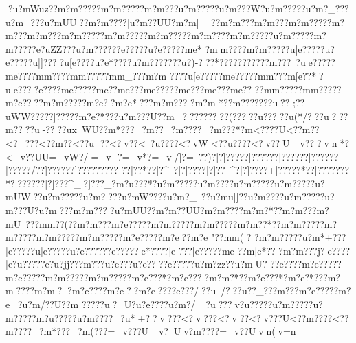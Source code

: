 {{{{{{{{{{{{{{{{{{{{{{{{{{{{{{{{{{{{{{{{{{{{{{{{{{{{{{{{{{{{{{{{{{{{{{{{{{{{{{{{{{{{{{{{{{{{{{{{{{{{{{{{{{{{{{{{{{{{{{{{{{{{{{{{{{{{{{{{{{{{{{{{{{{{{{{{{{{{{{{{{{{{{{{{{{{{{{{{{{{{{{{{{{{{{{{{{{{{{{{{{{{{{{{{{{{{{{{{{{{{{{{{{{{{{{{{{{{{{{{{{{{{{{{{{{{{{{{{{{{{{{{{{{{{{{{{{{{{{{{{{{{{{{{{{{{{{{{{{{{{{{{{{{{{{{{{{{{{{{{{{{{{{{{{{{{{{{{{{{{{{{{{{{{{{{{{{{{{{{{{{{{{{{{{{{{{{{{{{{{{{{{{{{{{{{{{{{{{{{{{{{{{{{{{{{{{{{{{{{{{{{{{{{{{{{{{{{{{{{{{{{{{{{{{{{{{{{{{{{{{{{{{{{{{{{{{{{{{{{{{{{{{{{{{{{{{{{{{{{{{{{{{{{{{{{{{{{{{{{{{{{{{{{{{{{{{{{{{{{{{{{{{{{{{{{{{{{{{{{{{{{{{{{{{{{{{{{{{{{{{{{{{{{{{{{{{{{{{{{{{{{{{{{{{{{{{{{{{{{{{{{{{{{{{{{{{{{{{{{{{{{{{{{{{{{{{{{{{{{{{{{{{{{{{{{{{{{{{{{{{{{{{{{{{{{{{{{{{{{{{{{{{{{{{{{{{{{{{{{{{?u?mWuz??m?m?????m?m?????m?m  ???u?m?????u?m???W?u?m?????u?m?_???u?m_}???u?mUU??m?m????|u?m??UU?m?m]_~??m?m???m?m???m?m?????m?m???m?m???m?m?????m?m?????m?m?????m?m???}?m?m?????u?m?????m?m?????e?uZZ???u?m?????}?e?????u?e?????m{e*
  ?m|m????m?m?????u|e?????u?e?????u|]????u[e??? ?u?e*????u?m???????u?)-???}*  ????}???????m???~?u|e?????m{e????m{m????m{m?????m{m_???{m?m ????u[e?????m{e?????m{m??  ?m[e??*?u|e????}{e????m{e?????m{e?   ?m{e???m{e?????m{e???m{e???m{e??
??m{m?????m{m?????m?e????m?m?????m?e?  ?m?e*???m?m???
?m?m
*  ?}?m???????u??-;??uWW?????]?????m?e?*???u?m???U?}?m???}??????}(?????u ?????u(*/???u ??}?m????u-????ux~WU?}?m*???~?m  ??~?m????~?m???*?m<????U<??m??
 <?~???<??m??  <??u
??<?v??<~?u????<?vW{}<??u????<?v??U~v???vn *?<~v??UU=~vW?/=~v-
 ?=~v  *?=~v  /]?=~??)?|?]?????|?}?????|?}?????|?}?????|?}????/??]???? ??]???? ??}???
 ??|??*  ??|?^~?|?]??? ?|?]??~^?|?]????+|?}????*??]???  ??}??*? |?}?????|?]???^_|?]? ??_?m?u???*?u?m?????u?m ????u?m?????u?m?????u?mUW??u?m?????u?m????u?mW????u?m?_~??u?mu]]??u?m????u?m?????u?m???U?u?m{???m?m????u?mUU}??m?m??UU?m?m??? ?m?m?*? ?m?m???m?mU~???m{m??(??m?m???m?e?????m?m?????m?m?????m?m??*??m?m?????m?m?????m?m?????m?m?????m?e?????m?e  ??m?e 
"??m{m(
? ?m?m?????u?m*+???}|e?????u|e?????u?e?????}?e?????}|e*????}|e 
???}|e?????m{e
?  ?m|e*??
?m?m???j?}|e????|e?u?????e?u?jj??}?m???u?e???u?e?? ?}?e?????u?m?zz??u?mU?-?}?e????m?e?????m?e?????m?m?????m?m?????m?e???*?m?e????m?m?*??m?e???*?m?e?*???m?m????m?m??m?e?? ??m?e ??m?e ???}?e???/??u--/???u ??_???m\x???m?e?????m?e ?u?m/??U?}?m
????}?u?_U?u?e ????u?m ?/~?u???v?u?????u?m?????u?m?????m?u?????u?m????~?u*+??v???<?v???<?v ??<?v???U<??m????<??m????~?m*???~?m(???=~v???U~v?Uv?m????=~v??Uvn(   v=n 
}}}}}}}}}}}}}}}}}}}}}}}}}}}}}}}}}}}}}}}}}}}}}}}}}}}}}}}}}}}}}}}}}}}}}}}}}}}}}}}}}}}}}}}}}}}}}}}}}}}}}}}}}}}}}}}}}}}}}}}}}}}}}}}}}}}}}}}}}}}}}}}}}}}}}}}}}}}}}}}}}}}}}}}}}}}}}}}}}}}}}}}}}}}}}}}}}}}}}}}}}}}}}}}}}}}}}}}}}}}}}}}}}}}}}}}}}}}}}}}}}}}}}}}}}}}}}}}}}}}}}}}}}}}}}}}}}}}}}}}}}}}}}}}}}}}}}}}}}}}}}}}}}}}}}}}}}}}}}}}}}}}}}}}}}}}}}}}}}}}}}}}}}}}}}}}}}}}}}}}}}}}}}}}}}}}}}}}}}}}}}}}}}}}}}}}}}}}}}}}}}}}}}}}}}}}}}}}}}}}}}}}}}}}}}}}}}}}}}}}}}}}}}}}}}}}}}}}}}}}}}}}}}}}}}}}}}}}}}}}}}}}}}}}}}}}}}}}}}}}}}}}}}}}}}}}}}}}}}}}}}}}}}}}}}}}}}}}}}}}}}}}}}}}}}}}}}}}}}}}}}}}}}}}}}}}}}}}}}}}}}}}}}}}}}}}}}}}}}}}}}}}}}}}}}}}}}}}}}}}}}}}}}}}}}}}}}}}}}}}}}}}}}}}}}}}}}}}}}}}}}}}}}}}}}}}}}}}}}}}}}}}}}}}}}}}}}}}}}}}}}}}}}}}}}
